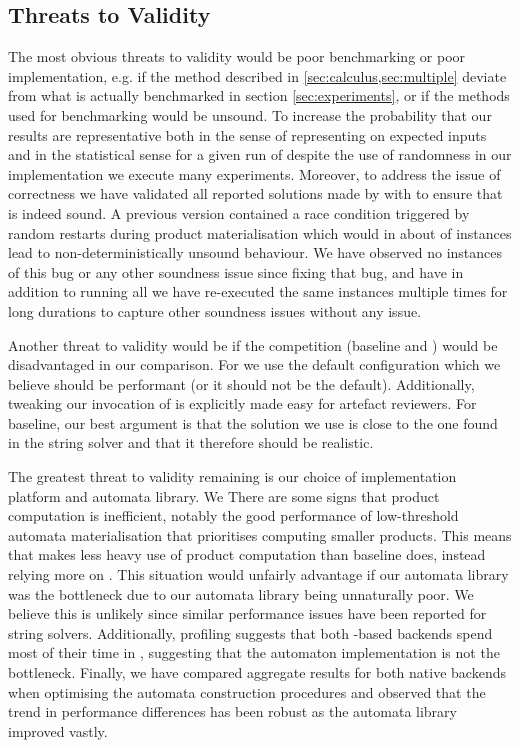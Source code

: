 
\subsection{Threats to Validity}

The most obvious threats to validity would be poor benchmarking or poor
implementation, e.g. if the method described in \cref{sec:calculus,sec:multiple}
deviate from what is actually benchmarked in section \cref{sec:experiments}, or
if the methods used for benchmarking would be unsound. To increase the
probability that our results are representative both in the sense of
representing  on expected inputs and in the statistical sense for a given run of
\Catra{} despite the use of randomness in our implementation we execute many
experiments. Moreover, to address the issue of correctness we have validated all
reported solutions made by \Calculus{} with \Nuxmv{} to ensure that \Calculus{}
is indeed sound. A previous version contained a race condition triggered by
random restarts during product materialisation which would in about
 of instances lead to non-deterministically unsound behaviour. We
have observed no instances of this bug or any other soundness issue since fixing
that bug, and have in addition to running all \NrBenchmarks{} we have
re-executed the same instances multiple times for long durations to capture
other soundness issues without any issue.

Another threat to validity would be if the competition (baseline and \Nuxmv)
would be disadvantaged in our comparison. For \Nuxmv{} we use the default
configuration which we believe should be performant (or it should not be the
default). Additionally, tweaking our invocation of \Nuxmv{} is explicitly made
easy for artefact reviewers. For baseline, our best argument is that the
solution we use is close to the one found in the \Ostrich{} string solver and
that it therefore should be realistic.

The greatest threat to validity remaining is our choice of implementation
platform and automata library. We There are some signs that product computation
is inefficient, notably the good performance of low-threshold automata
materialisation that prioritises computing smaller products. This means that
\Calculus{} makes less heavy use of product computation than baseline does,
instead relying more on \Princess{}. This situation would unfairly advantage
\Calculus{} if our automata library was the bottleneck due to our automata
library being unnaturally poor. We believe this is unlikely since similar
performance issues have been reported for string solvers. Additionally,
profiling suggests that both \Princess{}-based backends spend most of their time
in \Princess{}, suggesting that the automaton implementation is not the
bottleneck. Finally, we have compared aggregate results for both native backends
when optimising the automata construction procedures and observed that the trend
in performance differences has been robust as the automata library improved
vastly.
